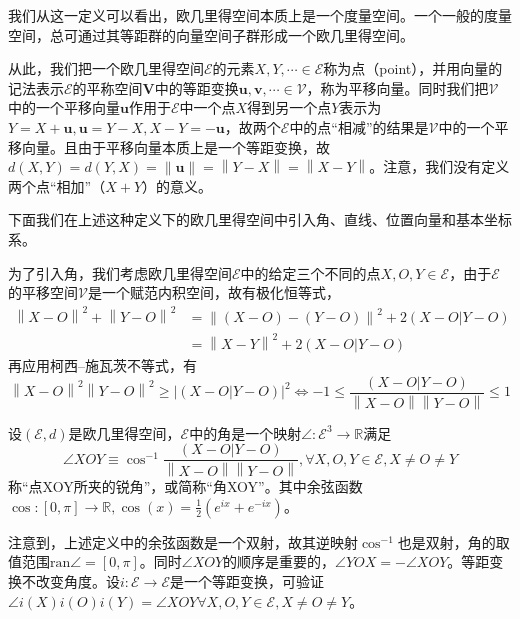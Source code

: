 \documentclass[main.tex]{subfiles}
\begin{document}
我们从这一定义可以看出，欧几里得空间本质上是一个度量空间。一个一般的度量空间，总可通过其等距群的向量空间子群形成一个欧几里得空间。

从此，我们把一个欧几里得空间$\mathcal{E}$的元素$X,Y,\cdots\in\mathcal{E}$称为点（point），并用向量的记法表示$\mathcal{E}$的平称空间$\mathbf{V}$中的等距变换$\mathbf{u},\mathbf{v},\cdots\in\mathcal{V}$，称为平移向量。同时我们把$\mathcal{V}$中的一个平移向量$\mathbf{u}$作用于$\mathcal{E}$中一个点$X$得到另一个点$Y$表示为$Y=X+\mathbf{u},\mathbf{u}=Y-X,X-Y=-\mathbf{u}$，故两个$\mathcal{E}$中的点“相减”的结果是$\mathcal{V}$中的一个平移向量。且由于平移向量本质上是一个等距变换，故$d\left(X,Y\right)=d\left(Y,X\right)=\left\|\mathbf{u}\right\|=\left\|Y-X\right\|=\left\|X-Y\right\|$。注意，我们没有定义两个点“相加”（$X+Y$）的意义。

下面我们在上述这种定义下的欧几里得空间中引入角、直线、位置向量和基本坐标系。

为了引入角，我们考虑欧几里得空间$\mathcal{E}$中的给定三个不同的点$X,O,Y\in\mathcal{E}$，由于$\mathcal{E}$的平移空间$\mathcal{V}$是一个赋范内积空间，故有极化恒等式，
\begin{align*}
\left\|X-O\right\|^2+\left\|Y-O\right\|^2&=\left\|\left(X-O\right)-\left(Y-O\right)\right\|^2+2\left(X-O|Y-O\right)\\
&=\left\|X-Y\right\|^2+2\left(X-O|Y-O\right)
\end{align*}
再应用柯西--施瓦茨不等式，有
\[\left\|X-O\right\|^2\left\|Y-O\right\|^2\geq\left|\left(X-O|Y-O\right)\right|^2\Leftrightarrow-1\leq\frac{\left(X-O|Y-O\right)}{\left\|X-O\right\|\left\|Y-O\right\|}\leq1\]

\begin{definition}[角]
设$\left(\mathcal{E},d\right)$是欧几里得空间，$\mathcal{E}$中的角是一个映射$\angle:\mathcal{E}^3\rightarrow\mathbb{R}$满足
\[\angle XOY\equiv\cos^{-1}\frac{\left(X-O|Y-O\right)}{\left\|X-O\right\|\left\|Y-O\right\|},\forall X,O,Y\in\mathcal{E},X\neq O\neq Y\]
称“点XOY所夹的锐角”，或简称“角XOY”。其中余弦函数$\cos:\left[0,\pi\right]\rightarrow\mathbb{R},\cos\left(x\right)=\frac{1}{2}\left(e^{ix}+e^{-ix}\right)$。
\end{definition}

注意到，上述定义中的余弦函数是一个双射，故其逆映射$\cos^{-1}$也是双射，角的取值范围$\mathrm{ran}\angle=\left[0,\pi\right]$。同时$\angle XOY$的顺序是重要的，$\angle YOX=-\angle XOY$。等距变换不改变角度。设$i:\mathcal{E}\rightarrow\mathcal{E}$是一个等距变换，可验证$\angle i\left(X\right)i\left(O\right)i\left(Y\right)=\angle XOY\forall X,O,Y\in\mathcal{E},X\neq O\neq Y$。
\end{document}
